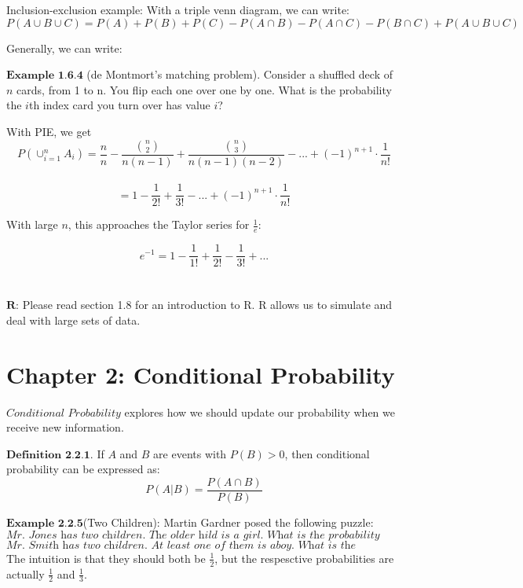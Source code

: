 \documentclass{article}
\begin{document}
    Inclusion-exclusion example: With a triple venn diagram, we can write:
    $$P(A\cup B\cup C)=P(A)+P(B)+P(C) - P(A\cap B)-P(A\cap C)-P(B\cap C)+P(A\cup B \cup C)$$
    
    Generally, we can write:



    $\textbf{Example 1.6.4}$ (de Montmort's matching problem). Consider a shuffled deck of $n$ cards, from 1 to n.
    You flip each one over one by one. What is the probability the $i$th index card
    you turn over has value $i$?

    With PIE, we get $$P(\cup_{i=1}^n A_i)=\frac{n}{n}-\frac{{n\choose 2}}{n(n-1)}
    +\frac{{n\choose 3}}{n(n-1)(n-2)}- ...+(-1)^{n+1}\cdot\frac{1}{n!}$$\\
    $$= 1-\frac{1}{2!}+\frac{1}{3!}-...+(-1)^{n+1}\cdot\frac{1}{n!}$$

    With large $n$, this approaches the Taylor series for $\frac{1}{e}$:

    $$e^{-1}=1-\frac{1}{1!}+\frac{1}{2!}-\frac{1}{3!}+...$$\\\\

    $\textbf{R}$: Please read section 1.8 for an introduction to R. R allows us to simulate and deal with large sets of data.

    \pagebreak
    
    \section{Chapter 2: Conditional Probability}

    $\textit{Conditional Probability}$ explores how we should update our probability when we receive new information.

    $\textbf{Definition 2.2.1}$. If $A$ and $B$ are events with $P(B)>0$, then conditional probability can be expressed as:
    $$P(A|B) = \frac{P(A\cap B)}{P(B)}$$

    $\textbf{Example 2.2.5}$(Two Children): Martin Gardner posed the following puzzle:\\
    $\textit{Mr. Jones has two children. The older hild is a girl. What is the probability that both children are girls?}$\\
    $\textit{Mr. Smith has two children. At least one of them is aboy. What is the probability that both children are boys?}$\\

    The intuition is that they should both be $\frac{1}{2}$, but the respesctive probabilities are actually $\frac{1}{2}$ and $\frac{1}{3}$.\\\\
\end{document}
